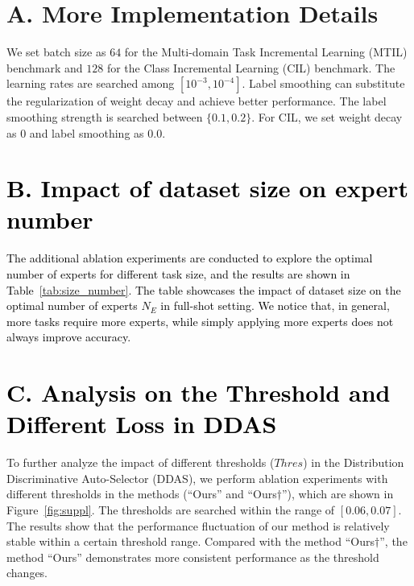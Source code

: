 \clearpage
\setcounter{page}{1}
\maketitlesupplementary



\section*{A. More Implementation Details}
\label{sec:More Implementation Details}
We set batch size as $64$ for the Multi-domain Task Incremental Learning (MTIL) benchmark and $128$ for the Class Incremental Learning (CIL) benchmark. The learning rates are searched among $[10^{-3}, 10^{-4}]$. Label smoothing can substitute the regularization of weight decay and achieve better performance. The label smoothing strength is searched between $\{0.1, 0.2\}$. For CIL, we set weight decay as $0$ and label smoothing as $0.0$.
\section*{\textcolor{black}{B. Impact of dataset size on expert number}}
\textcolor{black}{The additional ablation experiments are conducted to explore the optimal number of experts for different task size, and the results are shown in Table~\ref{tab:size_number}. The table showcases the impact of dataset size on the optimal number of experts $N_E$ in full-shot setting. We notice that, in general, more tasks require more experts, while simply applying more experts does not always improve accuracy.}

\section*{\textcolor{black}{C. Analysis on the Threshold and Different Loss in DDAS}}
\label{sec:Additional Analysis of different thresholds}
To further analyze the impact of different thresholds ($Thres$) in the Distribution Discriminative Auto-Selector (DDAS), we perform ablation experiments with different thresholds in the methods (``Ours'' and ``Ours$\dagger$''), which are shown in Figure~\ref{fig:suppl}. The thresholds are searched within the range of $[0.06, 0.07]$.
The results show that the performance fluctuation of our method is relatively stable within a certain threshold range. Compared with the method ``Ours$\dagger$'', the method ``Ours'' demonstrates more consistent performance as the threshold changes.


